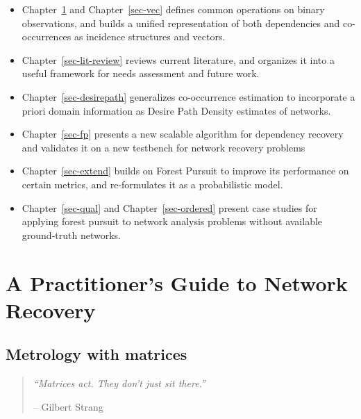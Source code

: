 \documentclass[%
	12pt,
		oneside,
		letterpaper
]{book}
\providecommand{\tightlist}{%
  \setlength{\itemsep}{0pt}\setlength{\parskip}{0pt}}
\begin{document}
\begin{itemize}
\tightlist
\item
  Chapter~\ref{sec-mat-met} and Chapter~\ref{sec-vec} defines common
  operations on binary observations, and builds a unified representation
  of both dependencies and co-occurrences as incidence structures and
  vectors.
\item
  Chapter~\ref{sec-lit-review} reviews current literature, and organizes
  it into a useful framework for needs assessment and future work.
\item
  Chapter~\ref{sec-desirepath} generalizes co-occurrence estimation to
  incorporate a priori domain information as Desire Path Density
  estimates of networks.\\
\item
  Chapter~\ref{sec-fp} presents a new scalable algorithm for dependency
  recovery and validates it on a new testbench for network recovery
  problems
\item
  Chapter~\ref{sec-extend} builds on Forest Pursuit to improve its
  performance on certain metrics, and re-formulates it as a
  probabilistic model.
\item
  Chapter~\ref{sec-qual} and Chapter~\ref{sec-ordered} present case
  studies for applying forest pursuit to network analysis problems
  without available ground-truth networks.
\end{itemize}

\part{A Practitioner's Guide to Network Recovery}

\chapter{Metrology with matrices}\label{sec-mat-met}

\begin{flushright}

\begin{minipage}{.7\linewidth}

\singlespacing

\begin{quote}
\emph{``Matrices act. They don't just sit there.''}

\hfill -- Gilbert Strang\\
\end{quote}

\doublespacing

\end{minipage}

\end{flushright}
\end{document}
